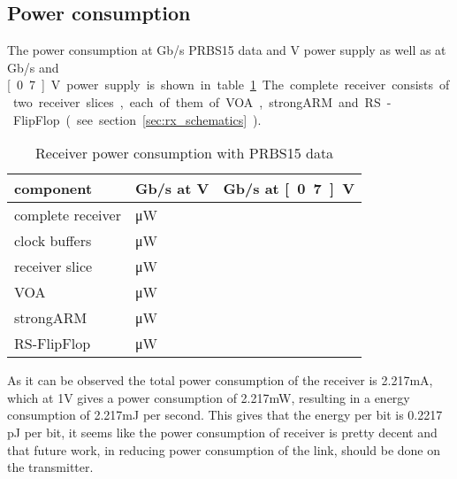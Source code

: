 \subsection{Power consumption}
The power consumption at \unit[10]{Gb/s} PRBS15 data and \unit[1]{V} power supply as well as at \unit[2]{Gb/s} and \unit[0.7]{V} power supply is shown in table \ref{tab:power_consumption_rx}. The complete receiver consists of two receiver slices, each of them of VOA, strongARM and RS-FlipFlop (see section \ref{sec:rx_schematics}).

\begin{table}[H] %
  \centering
  \begin{tabular}{l|l|l}
    component & \unit[10]{Gb/s} at \unit[1]{V} & \unit[2]{Gb/s} at \unit[0.7]{V}\\
    \hline
    complete receiver &  \unit[2217]{\uW}\\
    clock buffers & \unit[1888]{\uW}\\
    receiver slice & \unit[164,67]{\uW}\\
    VOA & \unit[49,54]{\uW}\\
    strongARM & \unit[42,27]{\uW}\\
    RS-FlipFlop & \unit[72,86]{\uW}\\
  \end{tabular}
  \caption{Receiver power consumption with PRBS15 data}
  \label{tab:power_consumption_rx}
\end{table}

As it can be observed the total power consumption of the receiver is 2.217mA, which at 1V gives a power consumption of 2.217mW, resulting in a energy consumption of 2.217mJ per second. This gives that the energy per bit is 0.2217 pJ per bit, it seems like the power consumption of receiver is pretty decent and that future work, in reducing power consumption of the link, should be done on the transmitter.